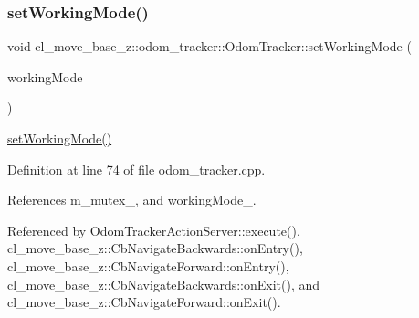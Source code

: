 \subsubsection{\texorpdfstring{set\+Working\+Mode()}{setWorkingMode()}}
{\footnotesize\ttfamily void cl\+\_\+move\+\_\+base\+\_\+z\+::odom\+\_\+tracker\+::\+Odom\+Tracker\+::set\+Working\+Mode (\begin{DoxyParamCaption}\item[{\hyperlink{namespacecl__move__base__z_1_1odom__tracker_ac46b05813b2791604f6cd0a39ace3ef8}{Working\+Mode}}]{working\+Mode }\end{DoxyParamCaption})}

\hyperlink{classcl__move__base__z_1_1odom__tracker_1_1OdomTracker_aeed01bdefd9a1cc709b0b3e4eed285ed}{set\+Working\+Mode()} 

Definition at line 74 of file odom\+\_\+tracker.\+cpp.



References m\+\_\+mutex\+\_\+, and working\+Mode\+\_\+.



Referenced by Odom\+Tracker\+Action\+Server\+::execute(), cl\+\_\+move\+\_\+base\+\_\+z\+::\+Cb\+Navigate\+Backwards\+::on\+Entry(), cl\+\_\+move\+\_\+base\+\_\+z\+::\+Cb\+Navigate\+Forward\+::on\+Entry(), cl\+\_\+move\+\_\+base\+\_\+z\+::\+Cb\+Navigate\+Backwards\+::on\+Exit(), and cl\+\_\+move\+\_\+base\+\_\+z\+::\+Cb\+Navigate\+Forward\+::on\+Exit().


